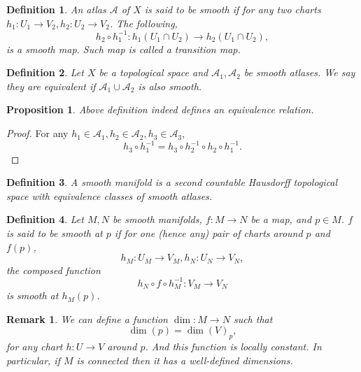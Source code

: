 \documentclass{article}
\newtheorem{proposition}{Proposition}[section]
\newtheorem{definition}{Definition}[section]
\newtheorem{remark}{Remark}[section]
\numberwithin{equation}{section}
\begin{document}
\begin{definition}
An atlas $\mathcal{A}$ of $X$ is said to be smooth if for any two charts $h_1:U_1\to V_2,h_2:U_2\to V_2$. The following,
\begin{equation*}
h_2\circ h_1^{-1}:h_1(U_1\cap U_2)\to h_2(U_1\cap U_2),
\end{equation*}
is a smooth map. Such map is called a transition map.
\end{definition}

\begin{definition}
Let $X$ be a topological space and $\mathcal{A}_1,\mathcal{A}_2$ be smooth atlases. We say they are equivalent if $\mathcal{A}_1\cup\mathcal{A}_2$ is also smooth.
\end{definition}

\begin{proposition}
Above definition indeed defines an equivalence relation.
\end{proposition}
\begin{proof}
For any $h_1\in \mathcal{A}_1,h_2\in \mathcal{A}_2,h_3\in \mathcal{A}_3$, 
\begin{equation*}
h_3\circ h^{-1}_1 = h_3\circ h^{-1}_2\circ h_2\circ h^{-1}_1.
\end{equation*}
\end{proof}



\begin{definition}
A smooth manifold is a second countable Hausdorff topological space with equivalence classes of smooth atlases.
\end{definition}

\begin{definition}
Let $M,N$ be smooth manifolds, $f:M\to N$ be a map, and $p\in M$. $f$ is said to be smooth at $p$ if for one (hence any) pair of charts around $p$ and $f(p)$, 
\begin{equation*}
h_M:U_M\to V_M, h_N:U_N\to V_N,
\end{equation*}
the composed function 
\begin{equation*}
h_N\circ f \circ h_M^{-1}:V_M\to V_N
\end{equation*}
is smooth at $h_M(p)$.
\end{definition}

\begin{remark}
We can define a function $\dim:M\to N$ such that
\begin{equation*}
\dim(p)=\dim(V)_p,
\end{equation*}
for any chart $h:U\to V$ around $p$. And this function is locally constant. In particular, if $M$ is connected then it has a well-defined dimensions.
\end{remark}
\end{document}
